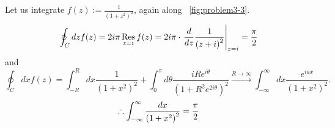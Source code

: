 \item

Let us integrate $f(z) := \frac{1}{{\left( 1 + z^2 \right)}^2}$, again along ~\ref{fig:problem3-3}.
\begin{align*}
	\oint_C dz f(z)
	= 2i\pi \mathop{\mathrm{Res}}_{z = i} f(z)
	= 2i\pi \cdot {\left. \frac{d}{dz} \frac{1}{{\left( z + i \right)}^2} \right|}_{z = i}
	= \frac{\pi}{2}
\end{align*}
and
\[
	\oint_C dx f(z)
	= \int_{-R}^{R} dx \frac{1}{{\left( 1 + x^2 \right)}^2}
	+ \int_0^{\pi} d\theta \frac{iRe^{i\theta}}{{\left( 1 + R^2 e^{2i\theta} \right)}^2}
	\xrightarrow{R \rightarrow \infty} \int_{-\infty}^{\infty} dx \frac{e^{iax}}{{\left( 1 + x^2 \right)}^2}.
\]
\[
	\therefore \int_{-\infty}^{\infty} \frac{dx}{{\left( 1 + x^2 \right)}^2} = \frac{\pi}{2}
\]